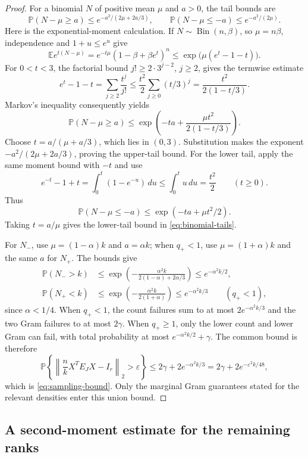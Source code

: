 \documentclass[11pt]{article}
\theoremstyle{definition}
\theoremstyle{remark}
\theoremstyle{plain}
\newcommand{\E}{\mathbb E}
\newcommand{\Prob}{\mathbb P}
\newcommand{\norm}[1]{\left\lVert#1\right\rVert_2}
\begin{document}
\begin{proof}
For a binomial \(N\) of positive mean \(\mu\) and $a>0$, the tail bounds are
\begin{equation}\label{eq:binomial-tails}
 \Prob(N-\mu\ge a)\le e^{-a^2/(2\mu+2a/3)},\qquad
 \Prob(N-\mu\le-a)\le e^{-a^2/(2\mu)}.
\end{equation}
Here is the exponential-moment calculation. If
$N\sim\operatorname{Bin}(n,\beta)$, so $\mu=n\beta$, independence
and $1+u\le e^u$ give
\[
 \E e^{t(N-\mu)}
   =e^{-t\mu}(1-\beta+\beta e^t)^n
   \le\exp\bigl(\mu(e^t-1-t)\bigr).
\]
For $0<t<3$, the factorial bound $j!\ge2\cdot3^{j-2}$,
$j\ge2$, gives the termwise estimate
\[
 e^t-1-t=\sum_{j\ge2}\frac{t^j}{j!}
       \le\frac{t^2}{2}\sum_{j\ge0}(t/3)^j
       =\frac{t^2}{2(1-t/3)}.
\]
Markov's inequality consequently yields
\[
 \Prob(N-\mu\ge a)
   \le\exp\left(-ta+\frac{\mu t^2}{2(1-t/3)}\right).
\]
Choose $t=a/(\mu+a/3)$, which lies in $(0,3)$. Substitution makes
the exponent $-a^2/(2\mu+2a/3)$, proving the upper-tail bound.
For the lower tail, apply the same moment bound with $-t$ and use
\[
 e^{-t}-1+t=\int_0^t(1-e^{-u})\,du
          \le\int_0^t u\,du=\frac{t^2}{2}\qquad(t\ge0).
\]
Thus
\[
 \Prob(N-\mu\le-a)\le\exp(-ta+\mu t^2/2).
\]
Taking $t=a/\mu$ gives the lower-tail bound in
\eqref{eq:binomial-tails}.

For $N_-$, use $\mu=(1-\alpha)k$ and $a=\alpha k$; when
$q_+<1$, use $\mu=(1+\alpha)k$ and the same $a$ for $N_+$.
The bounds give
\[
 \begin{aligned}
 \Prob(N_->k)
   &\le\exp\left(-\frac{\alpha^2k}{2(1-\alpha)+2\alpha/3}\right)
      \le e^{-\alpha^2k/2},\\
 \Prob(N_+<k)
   &\le\exp\left(-\frac{\alpha^2k}{2(1+\alpha)}\right)
      \le e^{-\alpha^2k/3}\qquad(q_+<1),
 \end{aligned}
\]
since $\alpha<1/4$. When $q_+<1$, the count failures sum to at most
$2e^{-\alpha^2k/3}$ and the two Gram failures to at most $2\gamma$.
When $q_+\ge1$, only the lower count and lower Gram can fail,
with total probability at most $e^{-\alpha^2k/2}+\gamma$.
The common bound is therefore
\[
 \Prob\left\{\norm{\frac nkX^TE_JX-I_r}>\varepsilon\right\}
       \le2\gamma+2e^{-\alpha^2k/3}
       =2\gamma+2e^{-\varepsilon^2k/48},
\]
which is \eqref{eq:sampling-bound}. Only the marginal Gram
guarantees stated for the relevant densities enter this union bound.
\end{proof}

\subsection{A second-moment estimate for the remaining ranks}
\end{document}
